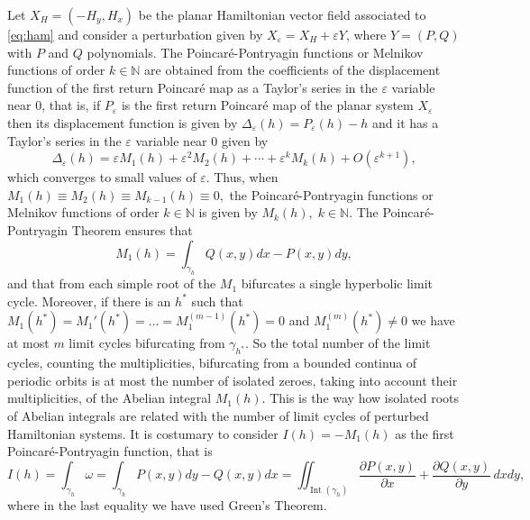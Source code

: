 \documentclass[12pt,a4paper,reqno]{amsart}
\newcommand{\N}{\mathbb{N}}
\begin{document}
    Let $ X_H = (- H_y, H_x) $ be the planar Hamiltonian vector field associated to \eqref{eq:ham} and consider a
    perturbation given by $ X _ {\varepsilon} = X_H + \varepsilon Y $, where
     $ Y = (P, Q) $ with $ P $ and $ Q $  polynomials.  The Poincar\'{e}-Pontryagin
     functions or Melnikov functions of  order $ k \in \N $ are obtained from  the coefficients
    of the displacement function of the first return Poincar\'{e} map as a Taylor's
    series in the $ \varepsilon $ variable near $ 0 $, that is, if $ P _ {\varepsilon} $ is the first return Poincar\'{e}
     map of the planar system $ X _ {\varepsilon} $ then its displacement function is given by $ \Delta _ {\varepsilon} (h) =
      P _ {\varepsilon} (h) - h $ and it has a Taylor's series in the $ \varepsilon $ variable near $ 0 $ given by
    \begin{equation*}
    \Delta_{\varepsilon}(h) = \varepsilon M_1(h) + \varepsilon^2 M_2(h) +\cdots+ \varepsilon^k M_k(h)+O(\varepsilon^{k+1}),
    \end{equation*}
    which converges to small values of $ \varepsilon $. Thus, when $M_1(h)\equiv M_2(h)\equiv M_{k-1}(h)\equiv0,$  the  Poincar\'{e}-Pontryagin functions
     or Melnikov functions of order $ k \in \N $ is given by $ M_k (h),  \; k \in \N $. The Poincar\'{e}-Pontryagin
     Theorem ensures that
    $$M_1(h) =  \displaystyle\int_{\gamma_h}Q(x,y) dx- P(x,y) dy,$$
    and that from each simple root of the
    $M_1$ bifurcates a single hyperbolic limit cycle.  Moreover,  if there is an $h^*$ such that
     $M_1(h^*)=M_1'(h^*)=\ldots=M_1^{(m-1)}(h^*)=0$ and $M_1^{(m)}(h^*) \neq 0$ we have at most $m$ limit cycles bifurcating from
     $\gamma_{h^*}.$
     So the total number of the limit cycles, counting the multiplicities,  bifurcating from a bounded continua of periodic orbits is at most
     the  number of isolated zeroes, taking into account their multiplicities, of the Abelian integral
      $M_1(h)$. This is the way how  isolated roots of Abelian integrals are related with
      the number of limit cycles of perturbed Hamiltonian systems.
      It is costumary to consider $I(h)=-M_1(h)$ as the first
      Poincar\'{e}-Pontryagin function, that is
     \begin{equation*}
    I(h)= \displaystyle\int_{\gamma_h} \omega=\displaystyle\int_{\gamma_h}  P (x, y) dy - Q (x, y) dx  =
    \iint_{\operatorname{Int}(\gamma_h)} \frac{\partial P(x,y)}{\partial x}+\frac{\partial Q(x,y)}{\partial y}\,dxdy,
    \end{equation*}
    where in the last equality we have used Green's Theorem.
\end{document}
